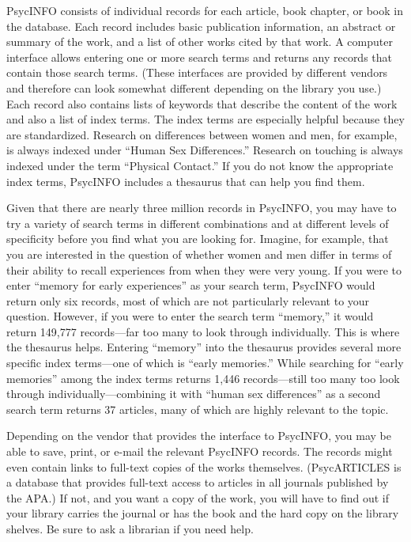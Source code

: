 \documentclass[
]{krantz}
\begin{document}
PsycINFO consists of individual records for each article, book chapter, or book in the database. Each record includes basic publication information, an abstract or summary of the work, and a list of other works cited by that work. A computer interface allows entering one or more search terms and returns any records that contain those search terms. (These interfaces are provided by different vendors and therefore can look somewhat different depending on the library you use.) Each record also contains lists of keywords that describe the content of the work and also a list of index terms. The index terms are especially helpful because they are standardized. Research on differences between women and men, for example, is always indexed under ``Human Sex Differences.'' Research on touching is always indexed under the term ``Physical Contact.'' If you do not know the appropriate index terms, PsycINFO includes a thesaurus that can help you find them.

Given that there are nearly three million records in PsycINFO, you may have to try a variety of search terms in different combinations and at different levels of specificity before you find what you are looking for. Imagine, for example, that you are interested in the question of whether women and men differ in terms of their ability to recall experiences from when they were very young. If you were to enter ``memory for early experiences'' as your search term, PsycINFO would return only six records, most of which are not particularly relevant to your question. However, if you were to enter the search term ``memory,'' it would return 149,777 records---far too many to look through individually. This is where the thesaurus helps. Entering ``memory'' into the thesaurus provides several more specific index terms---one of which is ``early memories.'' While searching for ``early memories'' among the index terms returns 1,446 records---still too many too look through individually---combining it with ``human sex differences'' as a second search term returns 37 articles, many of which are highly relevant to the topic.

Depending on the vendor that provides the interface to PsycINFO, you may be able to save, print, or e-mail the relevant PsycINFO records. The records might even contain links to full-text copies of the works themselves. (PsycARTICLES is a database that provides full-text access to articles in all journals published by the APA.) If not, and you want a copy of the work, you will have to find out if your library carries the journal or has the book and the hard copy on the library shelves. Be sure to ask a librarian if you need help.
\end{document}
